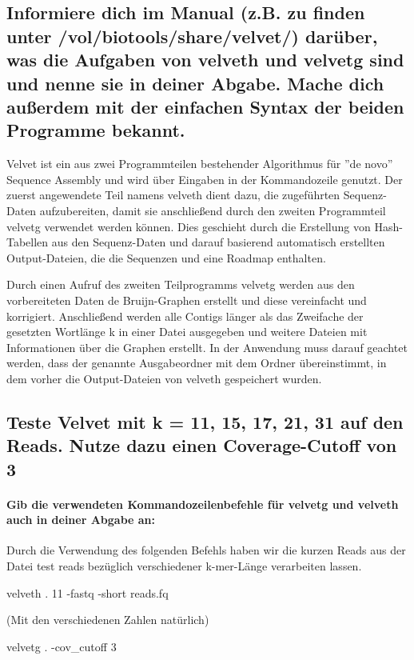 \documentclass[11pt,a4paper]{article}
\begin{document}
    \subsection{Informiere dich im Manual (z.B. zu finden unter /vol/biotools/share/velvet/) darüber, was die
    Aufgaben von velveth und velvetg sind und nenne sie in deiner Abgabe. Mache dich außerdem
    mit der einfachen Syntax der beiden Programme bekannt.}
    Velvet ist ein aus zwei Programmteilen bestehender Algorithmus für ”de novo” Sequence Assembly und wird über Eingaben in der Kommandozeile genutzt. Der zuerst angewendete Teil namens velveth dient dazu, die zugeführten Sequenz-Daten aufzubereiten, damit sie anschließend durch den zweiten Programmteil velvetg verwendet werden können. Dies geschieht durch die Erstellung von Hash-Tabellen aus den Sequenz-Daten und darauf basierend automatisch erstellten Output-Dateien, die die Sequenzen und eine Roadmap enthalten.

    Durch einen Aufruf des zweiten Teilprogramms velvetg werden aus den vorbereiteten Daten de Bruijn-Graphen erstellt und diese vereinfacht und korrigiert. Anschließend werden alle Contigs länger als das Zweifache der gesetzten Wortlänge k in einer Datei ausgegeben und weitere Dateien mit Informationen über die Graphen erstellt. In der Anwendung muss darauf geachtet werden, dass der genannte Ausgabeordner mit dem Ordner übereinstimmt, in dem vorher die Output-Dateien von velveth gespeichert wurden.


    \subsection{Teste Velvet mit k = 11, 15, 17, 21, 31 auf den Reads. Nutze dazu einen Coverage-Cutoff von 3}

    \paragraph{Gib
    die verwendeten Kommandozeilenbefehle für velvetg und velveth auch in deiner Abgabe an:}
    Durch die Verwendung des folgenden Befehls haben wir die kurzen Reads aus der Datei test reads bezüglich verschiedener k-mer-Länge verarbeiten lassen.
    \begin{center}
        velveth . 11 -fastq -short reads.fq
    \end{center}
    (Mit den verschiedenen Zahlen natürlich)
    \begin{center}
        velvetg . -cov\_cutoff 3
    \end{center}
\end{document}
